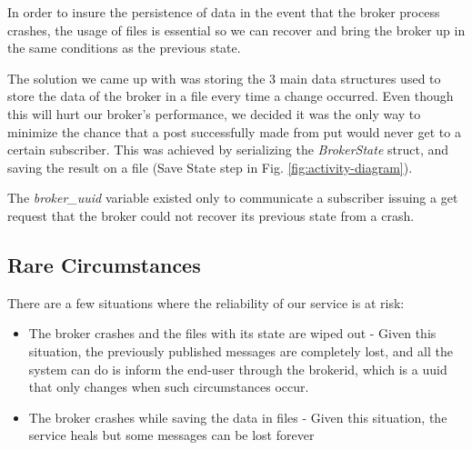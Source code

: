 In order to insure the persistence of data in the event that the broker process crashes, the usage of files is essential so we can recover and bring the broker up in the same conditions as the previous state.

The solution we came up with was storing the 3 main data structures used to store the data of the broker in a file every time a change occurred. Even though this will hurt our broker's performance, we decided it was the only way to minimize the chance that a post successfully made from put would never get to a certain subscriber. 
This was achieved by serializing the \emph{BrokerState} struct, and saving the result on a file (Save State step in Fig. \ref{fig:activity-diagram}). 

The \emph{broker\_uuid} variable existed only to communicate a subscriber issuing a get request that the broker could not recover its previous state from a crash. 


\subsection{Rare Circumstances}

There are a few situations where the reliability of our service is at risk:

\begin{itemize}
    \item The broker crashes and the files with its state are wiped out - Given this situation, the previously published messages are completely lost, and all the system can do is inform the end-user through the brokerid, which is a uuid that only changes when such circumstances occur.
    \item The broker crashes while saving the data in files - Given this situation, the service heals but some messages can be lost forever
\end{itemize}

